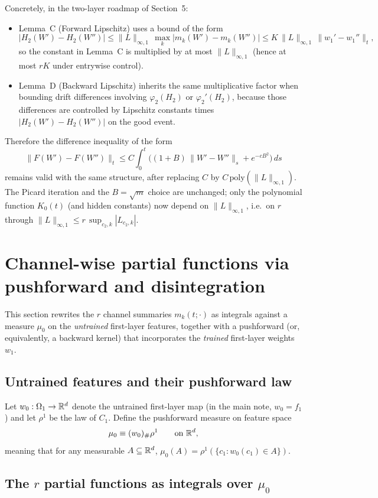 Concretely, in the two-layer roadmap of Section~5:
\begin{itemize}
\item Lemma~C (Forward Lipschitz) uses a bound of the form
\[
|H_2(W')-H_2(W'')|
\le \|L\|_{\infty,1}\,\max_k |m_k(W')-m_k(W'')|
\le K\,\|L\|_{\infty,1}\,\|w_1'-w_1''\|_t,
\]
so the constant in Lemma~C is multiplied by at most $\|L\|_{\infty,1}$ (hence at most $rK$ under entrywise control).
\item Lemma~D (Backward Lipschitz) inherits the same multiplicative factor when bounding drift differences involving $\varphi_2(H_2)$ or $\varphi_2'(H_2)$, because those differences are controlled by Lipschitz constants times $|H_2(W')-H_2(W'')|$ on the good event.
\end{itemize}
Therefore the difference inequality of the form
\[
\|F(W')-F(W'')\|_t \le C\int_0^t\Big((1+B)\,\|W'-W''\|_s+e^{-cB^2}\Big)\,ds
\]
remains valid with the same structure, after replacing $C$ by $C\,\mathrm{poly}(\|L\|_{\infty,1})$.
The Picard iteration and the $B=\sqrt{m}$ choice are unchanged; only the polynomial function $K_0(t)$ (and hidden constants) now depend on $\|L\|_{\infty,1}$, i.e.\ on $r$ through $\|L\|_{\infty,1}\le r\,\sup_{c_2,k}|L_{c_2,k}|$.

\section{Channel-wise partial functions via pushforward and disintegration}
\provedflag

This section rewrites the $r$ channel summaries $m_k(t;\cdot)$ as integrals against a measure $\mu_0$ on the \emph{untrained} first-layer features, together with a pushforward (or, equivalently, a backward kernel) that incorporates the \emph{trained} first-layer weights $w_1$.

\subsection{Untrained features and their pushforward law}

Let $w_0:\Omega_1\to\mathbb{R}^d$ denote the untrained first-layer map (in the main note, $w_0=f_1$) and let $\rho^1$ be the law of $C_1$.
Define the pushforward measure on feature space
\[
\mu_0 \equiv (w_0)_{\#}\rho^1 \qquad\text{on }\mathbb{R}^d,
\]
meaning that for any measurable $A\subseteq \mathbb{R}^d$, $\mu_0(A)=\rho^1(\{c_1: w_0(c_1)\in A\})$.

\subsection{The $r$ partial functions as integrals over $\mu_0$}

